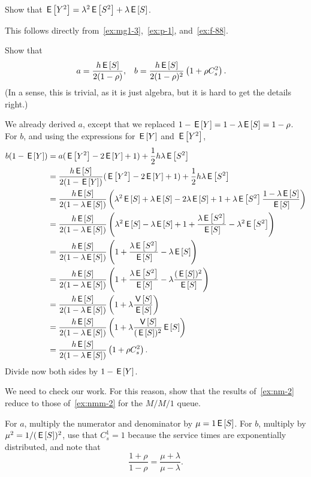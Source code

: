 \begin{extra}
  Show that $\E{Y^2} = \lambda^2 \E{S^2} + \lambda \E S$. 
  \begin{solution}
This follows directly from~\cref{ex:mg1-3},~\cref{ex:p-1}, and~\cref{ex:f-88}.
  \end{solution}
\end{extra}

\begin{exercise}
Show that 
\begin{align*}
  a &= \frac{h \E S}{2(1-\rho)}, &
  b &= \frac{h \E S}{2(1-\rho)^2} \left( 1+ \rho C_s^2\right).
\end{align*}
(In a sense, this is trivial, as it is just algebra, but it is hard to get the details right.)
\begin{solution}
  We already derived $a$, except that we replaced $1-\E Y= 1-\lambda \E S = 1-\rho$. 
For $b$, and using the expressions for $\E Y$ and $\E{Y^2}$, 
\begin{align*}
b(1-\E Y) &= a(\E{Y^2} - 2 \E Y + 1) + \frac 12 h \lambda \E{S^2} \\
&= \frac{h \E S}{2(1-\E Y)} (\E{Y^2} - 2 \E Y + 1) + \frac 12 h \lambda \E{S^2} \\
&= \frac{h \E S}{2(1-\lambda \E S)} \left(\lambda^2 \E{S} + \lambda \E S - 2 \lambda \E S + 1 +  \lambda \E{S^2}\frac{1-\lambda \E S}{\E S}\right) \\
&= \frac{h \E S}{2(1-\lambda \E S)} \left(\lambda^2 \E{S} - \lambda \E S + 1 +  \frac{\lambda \E{S^2}}{\E S} - \lambda^2 \E{S^2}\right) \\
&= \frac{h \E S}{2(1-\lambda \E S)} \left(1+ \frac{\lambda \E{S^2}}{\E S }  - \lambda \E S \right) \\
&= \frac{h \E S}{2(1-\lambda \E S)} \left( 1+ \frac{\lambda \E{S^2}}{\E S }  - \lambda \frac{(\E S)^2}{\E S}\right) \\
&= \frac{h \E S}{2(1-\lambda \E S)} \left( 1+ \lambda \frac{\V{S}}{\E S }\right)\\
&= \frac{h \E S}{2(1-\lambda \E S)} \left( 1+ \lambda \frac{\V{S}}{(\E S)^2 } \E S\right)\\
&= \frac{h \E S}{2(1-\lambda \E S)} \left( 1+ \rho C_s^2\right).
\end{align*}
Divide now both sides by $1-\E Y$. 
\end{solution}
\end{exercise}

\begin{extra}
We need to check our work.  For this reason, show that the results of~\cref{ex:nm-2} reduce to those of~\cref{ex:nmm-2} for the $M/M/1$ queue. 
\begin{solution}
  For $a$, multiply the numerator and denominator by $\mu=1\E S$.
  For $b$, multiply by $\mu^2 = 1/(\E S)^2$, use that $C_s^1=1$ because the service times are exponentially distributed, and note that
  \begin{equation*}
    \frac{1+\rho}{1-\rho} = \frac{\mu + \lambda}{\mu-\lambda}.
  \end{equation*}
\end{solution}
\end{extra}


